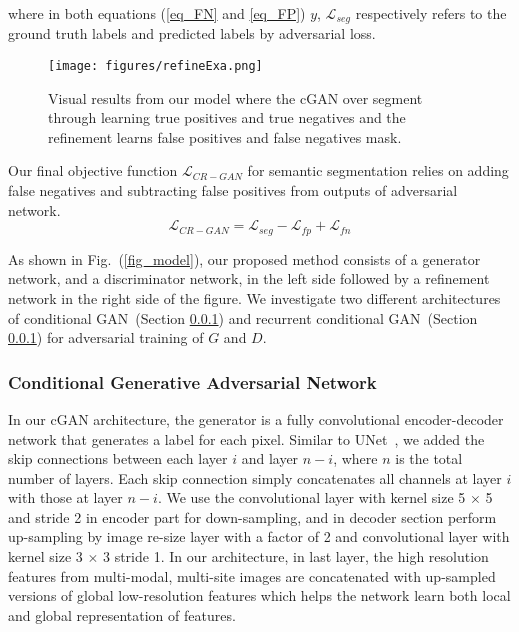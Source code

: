 \documentclass[10pt,twocolumn,letterpaper]{article}
\begin{document}
where in both equations (\ref{eq_FN} and \ref{eq_FP}) $y$, $\mathcal{L}_{seg}$ respectively refers to the ground truth labels and predicted labels by adversarial loss.

\begin{figure}[!t]
\texttt{[image: figures/refineExa.png]}
\centering
\caption{Visual results from our model where the cGAN over segment through learning true positives and true negatives and the refinement learns false positives and false negatives mask.}
\label{fig_mask}
\end{figure}

Our final objective function $\mathcal{L}_{CR-GAN}$ for semantic segmentation relies on adding false negatives and subtracting false positives from outputs of adversarial network. 
\begin{equation} \label{final_loss}
\mathcal{L}_{CR-GAN} = {\mathcal{L}_{seg} - \mathcal{L}_{fp} + \mathcal{L}_{fn}  } 
\end{equation}%

As shown in Fig.~(\ref{fig_model}), our proposed method consists of a generator network, and a discriminator network, in the left side followed by a refinement network in the right side of the figure.
We investigate two different architectures of conditional GAN~(Section \ref{method_sec1a}) and recurrent conditional GAN~(Section \ref{method_sec1a}) for adversarial training of $G$ and $D$.

\subsubsection{Conditional Generative Adversarial Network}\label{method_sec1a}
In our cGAN architecture, the generator is a fully convolutional encoder-decoder network that generates a label for each pixel.
Similar to UNet~\cite{ronneberger2015u}, we added the skip connections between each layer $i$ and layer $n-i$, where $n$ is the total number of layers.
Each skip connection simply concatenates all channels at layer $i$ with those at layer $n-i$.
We use the convolutional layer with kernel size 5 $\times$ 5 and stride 2 in encoder part for down-sampling, 
and in decoder section  perform up-sampling by image re-size layer with a factor of 2 and convolutional layer with kernel size 3 $\times$ 3 stride 1.
In our architecture, in last layer, the high resolution features from multi-modal, multi-site images are concatenated with up-sampled versions of global low-resolution features which helps the network learn both local and global representation of features.
\end{document}
